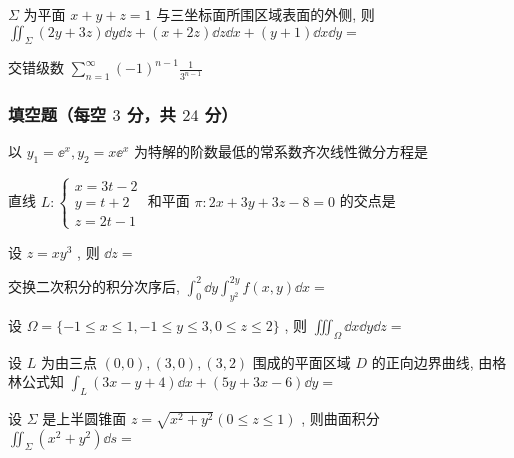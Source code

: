 \begin{ti}
	$\Sigma$ 为平面 $x+y+z=1$ 与三坐标面所围区域表面的外侧, 则 $\iint_{\Sigma}(2 y+3 z) \dd{y} \dd{z}+(x+2 z) \dd{z} \dd{x}+(y+1) \dd{x} \dd{y}=$ \kuo
\end{ti}

\begin{ti}
	交错级数 $\sum_{n=1}^{\infty}(-1)^{n-1} \frac{1}{3^{n-1}}$ \kuo
\end{ti}

\subsubsection{填空题（每空 $3$ 分，共 $24$ 分）}
\begin{ti}
	以 $y_{1}=\ee^{x}, y_{2}=x \ee^{x}$ 为特解的阶数最低的常系数齐次线性微分方程是 \hua{}
\end{ti}

\begin{ti}
	直线 $L:\begin{cases}
		x=3t-2\\
		y=t+2\\
		z=2t-1
	\end{cases}$ 和平面 $\pi:2 x+3 y+3 z-8=0$ 的交点是 \hua{}
\end{ti}

\begin{ti}
	设 $z=xy^3$ , 则 $\dd{z}=$ \hua{}
\end{ti}

\begin{ti}
	交换二次积分的积分次序后, $\int_{0}^{2} \dd{y} \int_{y^{2}}^{2 y} f(x, y) \dd{x}=$ \hua{}
\end{ti}

\begin{ti}
	设 $\Omega=\{-1 \leqslant x \leqslant 1,-1 \leqslant y \leqslant 3,0 \leqslant z \leqslant 2\}$ , 则 $\iiint_{\Omega} \dd{x} \dd{y} \dd{z}=$ \hua{}
\end{ti}

\begin{ti}
	设 $L$ 为由三点 $(0,0),(3,0),(3,2)$ 围成的平面区域 $D$ 的正向边界曲线, 由格林公式知 $\int_{L}(3 x-y+4) \dd{x}+(5 y+3 x-6) \dd{y}=$ \hua{}
\end{ti}

\begin{ti}
	设 $\Sigma$ 是上半圆锥面 $z=\sqrt{x^{2}+y^{2}}(0 \leqslant z \leqslant 1)$ , 则曲面积分 $\iint_{\Sigma}\left(x^2+y^2\right)\dd{s}=$ \hua{}
\end{ti}

